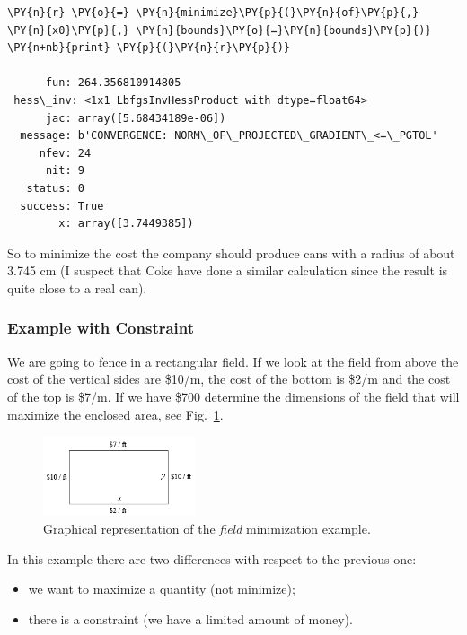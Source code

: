 \begin{tcolorbox}[breakable, size=fbox, boxrule=1pt, pad at break*=1mm,colback=cellbackground, colframe=cellborder]
\begin{Verbatim}[commandchars=\\\{\}]
\PY{n}{r} \PY{o}{=} \PY{n}{minimize}\PY{p}{(}\PY{n}{of}\PY{p}{,} \PY{n}{x0}\PY{p}{,} \PY{n}{bounds}\PY{o}{=}\PY{n}{bounds}\PY{p}{)}
\PY{n+nb}{print} \PY{p}{(}\PY{n}{r}\PY{p}{)}

      fun: 264.356810914805
 hess\_inv: <1x1 LbfgsInvHessProduct with dtype=float64>
      jac: array([5.68434189e-06])
  message: b'CONVERGENCE: NORM\_OF\_PROJECTED\_GRADIENT\_<=\_PGTOL'
     nfev: 24
      nit: 9
   status: 0
  success: True
        x: array([3.7449385])
    \end{Verbatim}
\end{tcolorbox}

So to minimize the cost the company should produce cans with a radius of
about 3.745 cm (I suspect that Coke have done a similar calculation since the result is quite close to a real can).

\subsubsection{Example with Constraint}\label{example-with-constraint}

We are going to fence in a rectangular field. If we look at the field
from above the cost of the vertical sides are \$10/m, the cost of the
bottom is \$2/m and the cost of the top is \$7/m. If we have \$700 determine
the dimensions of the field that will maximize the enclosed area, see Fig.~\ref{fig:field}.

\begin{figure}[h]
\centering
\includegraphics[width=0.4\textwidth]{figures/field.png}
\caption{Graphical representation of the \emph{field} minimization example.}
\label{fig:field}
\end{figure}

In this example there are two differences with respect to the previous one:

\begin{itemize}
\tightlist
\item
  we want to maximize a quantity (not minimize);
\item
  there is a constraint (we have a limited amount of money).
\end{itemize}

